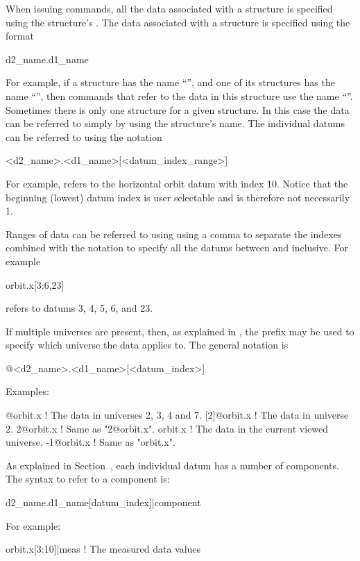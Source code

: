 When issuing \tao commands, all the
data associated with a  structure is specified using the
 structure's .  The data associated with a
 structure is specified using the format
\begin{example}
  d2_name.d1_name
\end{example}
For example, if a  structure has the
name ``'', and one of its  structures has the
name ``'', then \tao commands that refer to the data in this
 structure use the name ``''. Sometimes there
is only one  structure for a given 
structure. In this case the data can be referred to simply by using
the  structure's name. The individual datums can be
referred to using the notation
\begin{example}
  <d2_name>.<d1_name>[<datum_index_range>]
\end{example}
For example,  refers to the horizontal orbit datum
with index 10. Notice that the beginning (lowest) datum index is user
selectable and is therefore not necessarily 1.

Ranges of data can be referred to using using a comma \vn{,} to
separate the indexes combined with the notation  to specify
all the datums between  and  inclusive. For example
\begin{example}
  orbit.x[3:6,23]
\end{example}
refers to datums 3, 4, 5, 6, and 23. 

If multiple universes are present, then, as explained in
, the prefix  may be used to specify which
universe the data applies to. The general notation is
\begin{example}
  @<d2_name>.<d1_name>[<datum_index>]
\end{example}
Examples:
\begin{example}
  [2:4,7]@orbit.x ! The  data in universes 2, 3, 4 and 7.
  [2]@orbit.x     ! The  data in universe 2. 
  2@orbit.x       ! Same as "2@orbit.x".
  orbit.x         ! The  data in the current viewed universe.
  -1@orbit.x      ! Same as "orbit.x".
\end{example}

As explained in Section~, each individual datum
has a number of components. The syntax to refer to a component is:
\begin{example}
  d2_name.d1_name[datum_index]|component
\end{example}
For example:
\begin{example}
  orbit.x[3:10]|meas     ! The measured data values
\end{example}

